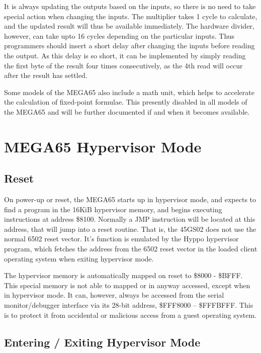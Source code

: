 It is always updating the outputs based on the inputs, so there is no need to take special action when changing the inputs.
The multiplier takes 1 cycle to calculate, and the updated result will thus be available immediately. The hardware divider,
however, can take upto 16 cycles depending on the particular inputs.  Thus programmers should insert a short delay after
changing the inputs before reading the output.  As this delay is so short, it can be implemented by simply reading the first
byte of the result four times consecutively, as the 4th read will occur after the result has settled.

Some models of the MEGA65 also include a math unit, which helps to accelerate the calculation of fixed-point formulae.
This presently disabled in all models of the MEGA65 and will be further documented if and when it becomes
available.



\section{MEGA65 Hypervisor Mode}
\label{sec:hypervisor-mode}

\subsection{Reset}

On power-up or reset, the MEGA65 starts up in hypervisor mode, and expects to find a program in the
16KiB hypervisor memory, and begins executing instructions at address \$8100.  Normally a JMP instruction
will be located at this address, that will jump into a reset routine. That is, the 45GS02
does not use the normal 6502 reset vector. It's function is emulated by the Hyppo hypervisor program,
which fetches the address from the 6502 reset vector in the loaded client operating system when
exiting hypervisor mode.

The hypervisor memory is automatically mapped on reset to \$8000 - \$BFFF.  This special memory is not
able to mapped or in anyway accessed, except when in hypervisor mode. It can, however, always be accessed from the serial monitor/debugger
interface via its 28-bit address, \$FFF8000 -- \$FFFBFFF.  This is to protect it from accidental or malicious access from a guest operating system.

\subsection{Entering / Exiting Hypervisor Mode}

